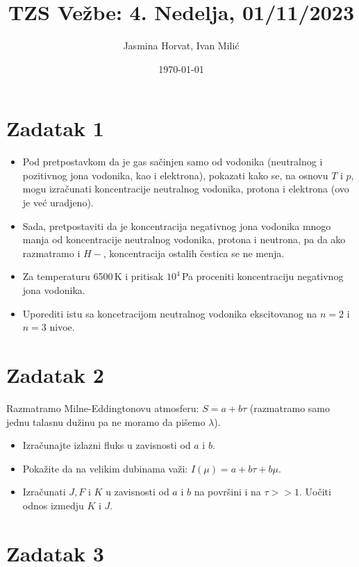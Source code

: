 \documentclass[12pt]{article}
\title{TZS Ve\v{z}be: 4. Nedelja, 01/11/2023}
\author{Jasmina Horvat, Ivan Mili\'{c}}
\date{\today}
\begin{document}
\maketitle

\section{Zadatak 1}
\begin{itemize}
    \item Pod pretpostavkom da je gas sa\v{c}injen samo od vodonika (neutralnog i pozitivnog jona vodonika, kao i elektrona), pokazati kako se, na osnovu $T$ i $p$, mogu izra\v{c}unati koncentracije neutralnog vodonika, protona i elektrona (ovo je ve\'{c} uradjeno).
    \item Sada, pretpostaviti da je koncentracija negativnog jona vodonika mnogo manja od koncentracije neutralnog vodonika, protona i neutrona, pa da ako razmatramo i $H-$, koncentracija ostalih \v{c}estica se ne menja. 
    \item Za temperaturu 6500\,K i pritisak $10^4$\,Pa proceniti koncentraciju negativnog jona vodonika. 
    \item Uporediti istu sa koncetracijom neutralnog vodonika ekscitovanog na $n=2$ i $n=3$ nivoe. 
\end{itemize}

\section{Zadatak 2}
Razmatramo Milne-Eddingtonovu atmosferu: $S = a +b \tau$ (razmatramo samo jednu talasnu du\v{z}inu pa ne moramo da pi\v{s}emo $\lambda$).

\begin{itemize}
\item Izra\v{c}unajte izlazni fluks u zavisnosti od $a$ i $b$.

\item Poka\v{z}ite da na velikim dubinama va\v{z}i: $I(\mu) = a + b\tau + b\mu$.

\item Izra\v{c}unati $J, F$ i $K$ u zavisnosti od $a$ i $b$ na povr\v{s}ini i na $\tau >> 1$. Uo\v{c}iti odnos izmedju $K$ i $J$. 

\end{itemize}

\section{Zadatak 3}
\end{document}

